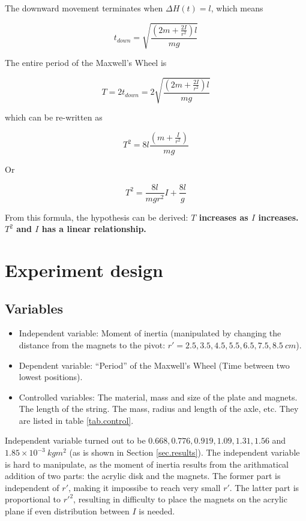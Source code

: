 \documentclass[a4paper]{article}
\begin{document}
The downward movement terminates when $\Delta H(t) = l$, which means 

\begin{equation}
    t_{down} = \sqrt{\dfrac{(2m+\frac{2I}{r^2})l}{mg}}
\end{equation}

The entire period of the Maxwell's Wheel is 

\begin{equation}
    T = 2t_{down} = 2\sqrt{\dfrac{(2m+\frac{2I}{r^2})l}{mg}}
\end{equation}

which can be re-written as 

\begin{equation}
    T^2 = 8l\dfrac{(m+\frac{I}{r^2})}{mg}
\end{equation}

Or

\begin{equation}
    T^2 = \dfrac{8l}{mgr^2} I + \dfrac{8l}{g}
\end{equation}

From this formula, the hypothesis can be derived: \textbf{$T$ increases as $I$ increases. $T^2$ and $I$ has a linear relationship.}

\section{Experiment design}

\subsection{Variables} 

\begin{itemize}
    \item Independent variable: Moment of inertia (manipulated by changing the distance from the magnets to the pivot: $r' = 2.5, 3.5, 4.5, 5.5, 6.5, 7.5, 8.5 \SI{}{cm}$).
    \item Dependent variable: ``Period'' of the Maxwell's Wheel (Time between two lowest positions).
    \item Controlled variables: The material, mass and size of the plate and magnets. The length of the string. The mass, radius and length of the axle, etc. They are listed in table \ref{tab.control}.
\end{itemize}

Independent variable turned out to be $0.668, 0.776, 0.919, 1.09, 1.31, 1.56$ and $1.85 \times 10^{-3}\SI{}{kgm^2}$ (as is shown in Section \ref{sec.results}). The independent variable is hard to manipulate, as the moment of inertia results from the arithmatical addition of two parts: the acrylic disk and the magnets. The former part is independent of $r'$, making it impossibe to reach very small $r'$. The latter part is proportional to $r'^2$, resulting in difficulty to place the magnets on the acrylic plane if even distribution between $I$ is needed. 
\end{document}

